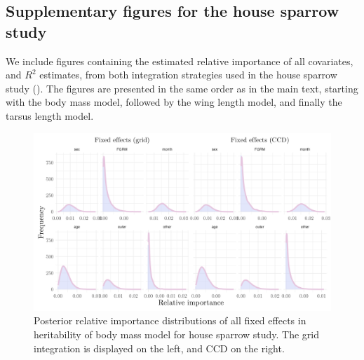 \subsection*{Supplementary figures for the house sparrow study}

We include figures containing the estimated relative importance of all covariates, and $R^2$ estimates, from both integration strategies used in the house sparrow study (). The figures are presented in the same order as in the main text, starting with the body mass model, followed by the wing length model, and finally the tarsus length model.

\begin{figure}[H]%
  \centering
  \includegraphics[width=1\linewidth]{Figures/House sparrow study/Mass_fixed.png}
  \caption[Posterior relative importance distributions of all fixed effects in body mass model for house sparrow study]{Posterior relative importance distributions of all fixed effects in heritability of body mass model for house sparrow study. The grid integration is displayed on the left, and CCD on the right.}
  \label{fig:mass_fixed_sparrows}
\end{figure}

